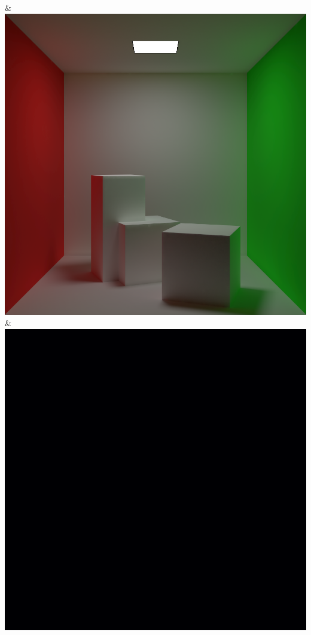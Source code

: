& \includegraphics[width=\linewidth]{figures/py/tests/quality_comparison/nrc+sppc_1min.png}
\\
& \includegraphics[width=\linewidth]{figures/py/tests/quality_comparison/pt_1min_flip.png}
